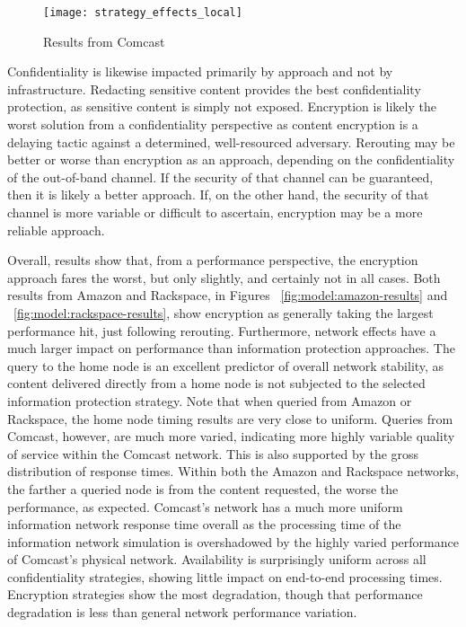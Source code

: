 \begin{figure}[!t]
\centering
\texttt{[image: strategy\_effects\_local]}
\caption{Results from Comcast}
\label{fig:model:comcast-results}
\end{figure}

Confidentiality is likewise impacted primarily by approach and not by infrastructure.  Redacting sensitive content provides the best confidentiality protection, as sensitive content is simply not exposed.  Encryption is likely the worst solution from a confidentiality perspective as content encryption is a delaying tactic against a determined, well-resourced adversary.  Rerouting may be better or worse than encryption as an approach, depending on the confidentiality of the out-of-band channel.  If the security of that channel can be guaranteed, then it is likely a better approach.  If, on the other hand, the security of that channel is more variable or difficult to ascertain, encryption may be a more reliable approach.

Overall, results show that, from a performance perspective, the encryption approach fares the worst, but only slightly, and certainly not in all cases.  Both results from Amazon and Rackspace, in Figures ~\ref{fig:model:amazon-results} and ~\ref{fig:model:rackspace-results}, show encryption as generally taking the largest performance hit, just following rerouting.
Furthermore, network effects have a much larger impact on performance than information protection approaches.  The query to the home node is an excellent predictor of overall network stability, as content delivered directly from a home node is not subjected to the selected information protection strategy.  Note that when queried from Amazon or Rackspace, the home node timing results are very close to uniform.  Queries from Comcast, however, are much more varied, indicating more highly variable quality of service within the Comcast network.  This is also supported by the gross distribution of response times.  Within both the Amazon and Rackspace networks, the farther a queried node is from the content requested, the worse the performance, as expected.  Comcast's network has a much more uniform information network response time overall as the processing time of the information network simulation is overshadowed by the highly varied performance of Comcast's physical network.  Availability is surprisingly uniform across all confidentiality strategies, showing little impact on end-to-end processing times.  Encryption strategies show the most degradation, though that performance degradation is less than general network performance variation.

